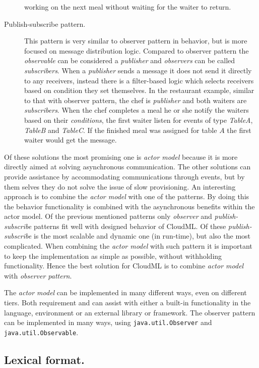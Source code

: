 \begin{description}
    working on the next meal without waiting for the waiter to return.
  \item[Publish-subscribe pattern.] This pattern is very similar to observer pattern in behavior,
    but is more focused on message distribution logic.
    Compared to observer pattern the \emph{observable} can be considered a \emph{publisher} and
    \emph{observers} can be called \emph{subscribers}.
    When a \emph{publisher} sends a message it does not send it directly to any receivers,
    instead there is a filter-based logic which selects receivers based on condition they set themselves.
    In the restaurant example, similar to that with observer pattern, the chef is \emph{publisher}
    and both waiters are \emph{subscribers}.
    When the chef completes a meal he or she notify the waiters based on their \emph{conditions},
    \eg the first waiter listen for events of type \emph{TableA}, \emph{TableB} and \emph{TableC}.
    If the finished meal was assigned for table $A$ the first waiter would get the message.
\end{description}
Of these solutions the most promising one is \emph{actor model} because it is more directly aimed
at solving asynchronous communication.
The other solutions can provide assistance by accommodating communications through events, 
but by them selves they do not solve the issue of slow provisioning.
An interesting approach is to combine the \emph{actor model} with one of the patterns.
By doing this the behavior functionality is combined with the asynchronous benefits within the actor model.
Of the previous mentioned patterns only \emph{observer} and \emph{publish-subscribe} patterns 
fit well with designed behavior of CloudML.
Of these \emph{publish-subscribe} is the most scalable and dynamic one (in run-time),
but also the most complicated.
When combining the \emph{actor model} with such pattern it is important to keep the implementation
as simple as possible, without withholding functionality.
Hence the best solution for CloudML is to combine \emph{actor model} with \emph{observer pattern}.

The \emph{actor model} can be implemented in many different ways, even on different tiers.
Both requirement  and  can assist with either
a built-in functionality in the language, environment or an external library or framework.
The observer pattern can be implemented in many ways,
\eg using \texttt{java.util.Observer} and \texttt{java.util.Observable}.

\subsection{Lexical format.}

